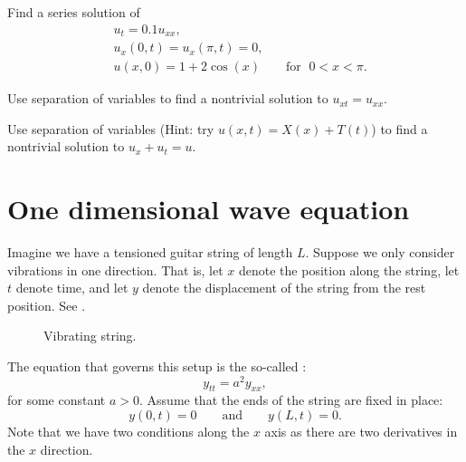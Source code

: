 \documentclass[12pt]{book}
\begin{document}

\begin{exercise}
Find a series solution of
\begin{align*}
& u_t =  0.1 u_{xx} , \\
& u_x(0,t) = u_x(\pi,t) = 0 , \\
& u(x,0) = 1 + 2\cos (x) \qquad \text{for } \; 0 < x < \pi .
\end{align*}
\end{exercise}

\begin{exercise}
Use separation of variables to find a nontrivial solution to
$u_{xt} = u_{xx}$.
\end{exercise}

\begin{exercise}
Use separation of variables (Hint: try $u(x,t) = X(x)+T(t)$)
to find a nontrivial solution to
$u_{x} + u_{t} = u$.
\end{exercise}


\sectionnewpage
\section{One dimensional wave equation} \label{we:section}


Imagine we have a tensioned guitar string of length $L$.  Suppose we
only consider vibrations in one direction.  That is, let
$x$ denote the position along the string, let $t$ denote time, and let $y$
denote the displacement of the string from the rest position.
See
.

\begin{figure}[h!t]
\capstart
\begin{center}
\caption{Vibrating string.\label{we:vibstrfig}}
\end{center}
\end{figure}

The equation that governs this setup is the so-called
\emph{}:
\begin{equation*}
\boxed{~~
y_{tt} =
a^2 y_{xx} ,
~~}
\end{equation*}
for some constant $a > 0$.
Assume that the ends of the string are fixed in place:
\begin{equation*}
y(0,t) = 0 \qquad \text{and} \qquad y(L,t) = 0.
\end{equation*}
Note that we have two conditions along the $x$ axis as there are
two derivatives in the $x$ direction.
\end{document}
